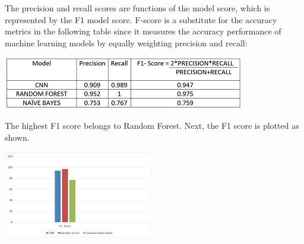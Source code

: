 \par The precision and recall scores are functions of the model score, which is represented by the F1 model score. F-score is a substitute for the accuracy metrics in the following table since it measures the accuracy performance of machine learning models by equally weighting precision and recall:
\begin{center}
    \includegraphics[]{tb4.jpg}
\end{center}
\par The highest F1 score belongs to Random Forest. Next, the F1 score is plotted as shown.
\begin{center}
    \includegraphics[]{g3.jpg}
\end{center}


